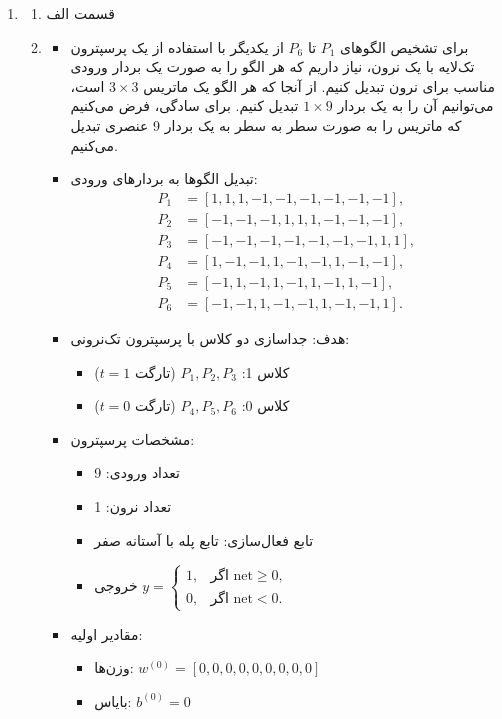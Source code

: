 \begin{enumerate}
	\item  
	\begin{enumerate}
		\item قسمت الف
		\item 
		\begin{itemize}
			\item برای تشخیص الگوهای $P_1$ تا $P_6$ از یکدیگر با استفاده از یک پرسپترون تک‌لایه با یک نرون، نیاز داریم که هر الگو را به صورت یک بردار ورودی مناسب برای نرون تبدیل کنیم. از آنجا که هر الگو یک ماتریس $3\times3$ است، می‌توانیم آن را به یک بردار $1\times9$ تبدیل کنیم. برای سادگی، فرض می‌کنیم که ماتریس را به صورت سطر به سطر به یک بردار 9 عنصری تبدیل می‌کنیم.
			\item تبدیل الگوها به بردارهای ورودی:
			\begin{align*}
				P_1 &= [1,1,1,-1,-1,-1,-1,-1,-1],\\
				P_2 &= [-1,-1,-1,1,1,1,-1,-1,-1],\\
				P_3 &= [-1,-1,-1,-1,-1,-1,-1,1,1],\\
				P_4 &= [1,-1,-1,1,-1,-1,1,-1,-1],\\
				P_5 &= [-1,1,-1,1,-1,1,-1,1,-1],\\
				P_6 &= [-1,-1,1,-1,-1,1,-1,-1,1].
			\end{align*}
			\item هدف: جداسازی دو کلاس با پرسپترون تک‌نرونی:
			\begin{itemize}
				\item کلاس 1: $P_1, P_2, P_3$ (تارگت $t=1$)
				\item کلاس 0: $P_4, P_5, P_6$ (تارگت $t=0$)
			\end{itemize}
			\item مشخصات پرسپترون:
			\begin{itemize}
				\item تعداد ورودی: 9
				\item تعداد نرون: 1
				\item تابع فعال‌سازی: تابع پله با آستانه صفر
				\item خروجی $y=\begin{cases}1,&\text{اگر }\mathrm{net}\ge0,\\0,&\text{اگر }\mathrm{net}<0.\end{cases}$
			\end{itemize}
			\item مقادیر اولیه:
			\begin{itemize}
				\item وزن‌ها: $w^{(0)}=[0,0,0,0,0,0,0,0,0]$
				\item بایاس: $b^{(0)}=0$

\end{itemize}
\end{itemize}
\end{enumerate}
\end{enumerate}
